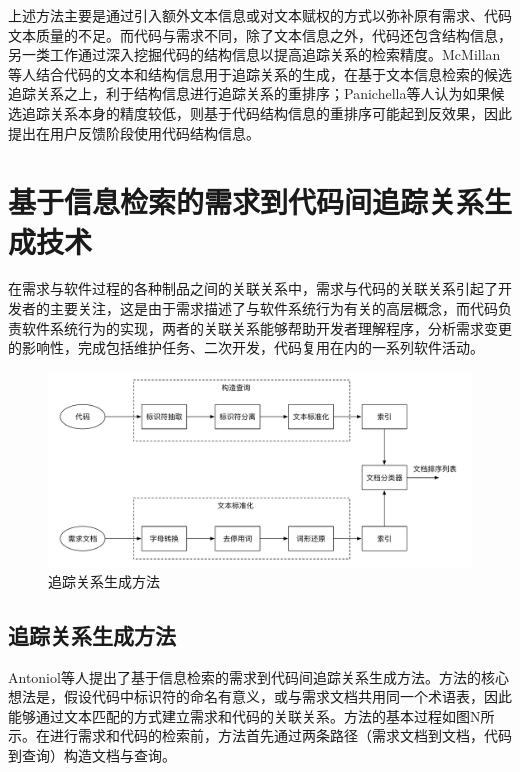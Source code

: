 上述方法主要是通过引入额外文本信息或对文本赋权的方式以弥补原有需求、代码文本质量的不足。而代码与需求不同，除了文本信息之外，代码还包含结构信息，另一类工作通过深入挖掘代码的结构信息以提高追踪关系的检索精度。McMillan等人\cite{mcmillan2009combining}结合代码的文本和结构信息用于追踪关系的生成，在基于文本信息检索的候选追踪关系之上，利于结构信息进行追踪关系的重排序；Panichella等人\cite{panichella2013and}认为如果候选追踪关系本身的精度较低，则基于代码结构信息的重排序可能起到反效果，因此提出在用户反馈阶段使用代码结构信息。

\section{基于信息检索的需求到代码间追踪关系生成技术}

在需求与软件过程的各种制品之间的关联关系中，需求与代码的关联关系引起了开发者的主要关注，这是由于需求描述了与软件系统行为有关的高层概念，而代码负责软件系统行为的实现，两者的关联关系能够帮助开发者理解程序，分析需求变更的影响性，完成包括维护任务、二次开发，代码复用在内的一系列软件活动。

\begin{figure}[thb]
    \centering
    \includegraphics[width=1.0\textwidth]{./figures/related_work/ir_traceability_process.pdf}
    \caption{追踪关系生成方法}
    \label{F:BuildLogScrn}
\end{figure}

\subsection{追踪关系生成方法}

Antoniol等人\cite{antoniol2002recovering}提出了基于信息检索的需求到代码间追踪关系生成方法。方法的核心想法是，假设代码中标识符的命名有意义，或与需求文档共用同一个术语表，因此能够通过文本匹配的方式建立需求和代码的关联关系。方法的基本过程如图N所示。在进行需求和代码的检索前，方法首先通过两条路径（需求文档到文档，代码到查询）构造文档与查询。

